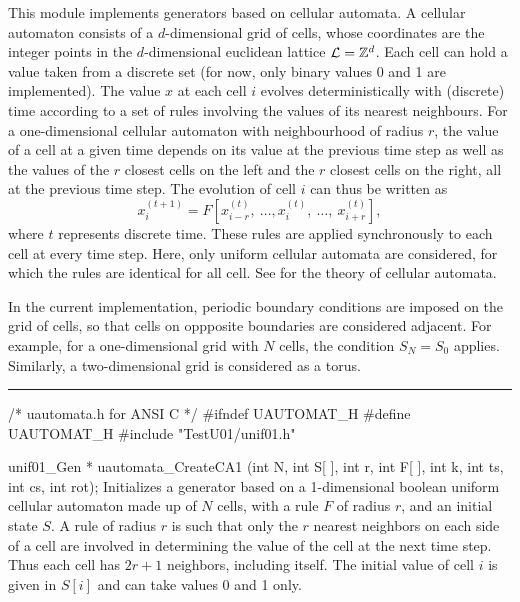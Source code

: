 
This module implements generators based on cellular automata. A cellular
automaton consists of a $d$-dimensional grid of cells, whose coordinates are
the integer points in the \mbox{$d$-dimensional} euclidean lattice
 ${\cal L} = \mathbb{Z}^d$. Each cell can hold a value taken from a discrete
 set (for now, only binary values 0 and 1 are implemented).
The value $x$ at each cell $i$ evolves deterministically with (discrete)
 time according
to a set of rules involving the values of its nearest neighbours. For a
one-dimensional cellular automaton with neighbourhood of radius $r$, the value
 of a cell at a given time depends on its value at the previous time
 step  as well as the values of the $r$ closest cells on
 the left and  the $r$ closest cells on the right, all at the previous time
 step. The evolution of cell $i$ can thus be written as
$$
   x_i^{(t+1)} = F\left[ x_{i-r}^{(t)},\ \ldots, x_{i}^{(t)},\  \ldots,
                 \ x_{i+r}^{(t)}\right],
$$
where $t$ represents discrete time.
These rules are applied synchronously to each cell at every time step.
Here, only uniform cellular automata are considered, for which the rules
are identical for all cell.
See \cite{rWOL86a,rWOL86b,rTOM99a}
for the theory of  cellular automata.

In the current implementation,
periodic boundary conditions are imposed on the grid of cells, so that
 cells on oppposite boundaries are considered adjacent. For example, for a
one-dimensional grid with $N$ cells, the condition $S_N = S_0$ applies.
Similarly, a two-dimensional grid is considered as a torus.



\bigskip
\hrule
\code\hide
/* uautomata.h for ANSI C */
#ifndef UAUTOMAT_H
#define UAUTOMAT_H
\endhide
#include "TestU01/unif01.h"

unif01_Gen * uautomata_CreateCA1 (int N, int S[ ], int r, int F[ ],
                                  int k, int ts, int cs, int rot);
\endcode
  \tab  Initializes a generator based on a 1-dimensional boolean uniform
 cellular automaton made up of $N$ cells, with a rule $F$ of radius $r$,
 and an initial state $S$. A rule of radius $r$ is such that only the $r$
 nearest neighbors on each side of a cell are involved in determining the
 value of the cell at the next time step. Thus each cell has $2r+1$
 neighbors, including itself.
 The initial value of cell $i$ is given in $S[i]$ and can take
%
 values 0 and 1 only.

